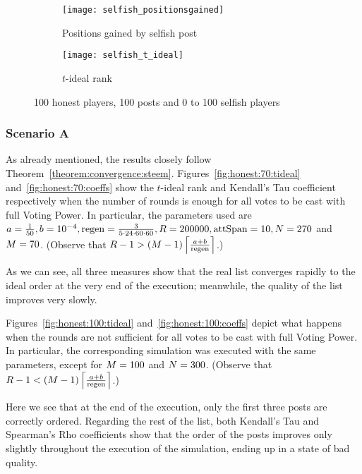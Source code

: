 \documentclass[a4paper,english,cleveref, autoref]{oasics-v2019}
\begin{document}
    \begin{figure}[ht]
      \begin{subfigure}[t]{0.5\textwidth}
        \centering
        \texttt{[image: selfish\_positionsgained]}
        \caption{Positions gained by selfish post}
        \label{fig:selfish:gain}
      \end{subfigure}\hfill
      \begin{subfigure}[t]{0.5\textwidth}
        \centering
        \texttt{[image: selfish\_t\_ideal]}
        \caption{$t$-ideal rank}
        \label{fig:selfish:tideal}
      \end{subfigure}
      \caption{100 honest players, 100 posts and 0 to 100 selfish players}
    \end{figure}

    \subsubsection{Scenario A}
      As already mentioned, the results closely follow
      Theorem~\ref{theorem:convergence:steem}.
      Figures~\ref{fig:honest:70:tideal} and~\ref{fig:honest:70:coeffs} show the
      $t$-ideal rank and Kendall's Tau coefficient respectively when the number
      of rounds is enough for all votes to be cast with full Voting Power. In
      particular, the parameters used are $a = \frac{1}{50}, b = 10^{-4}, \regen
      = \frac{3}{5 \cdot 24 \cdot 60 \cdot 60}, \rounds = 200000, \attspan = 10,
      \playerlen = 270$ and $\postlen = 70$. (Observe that $\rounds - 1 >
      \left(\postlen - 1\right)\ceil*{\frac{a + b}{\regen}}$.)

      As we can see, all three measures show that the real list converges
      rapidly to the ideal order at the very end of the execution; meanwhile,
      the quality of the list improves very slowly.

      Figures~\ref{fig:honest:100:tideal} and~\ref{fig:honest:100:coeffs} depict
      what happens when the rounds are not sufficient for all votes to be cast
      with full Voting Power. In particular, the corresponding simulation was
      executed with the same parameters, except for $\postlen = 100$ and
      $\playerlen = 300$. (Observe that $\rounds - 1 < \left(\postlen -
      1\right)\ceil*{\frac{a + b}{\regen}}$.)

      Here we see that at the end of the execution, only the first three posts
      are correctly ordered. Regarding the rest of the list, both Kendall's Tau
      and Spearman's Rho coefficients show that the order of the posts improves
      only slightly throughout the execution of the simulation, ending up in a
      state of bad quality.
\end{document}
